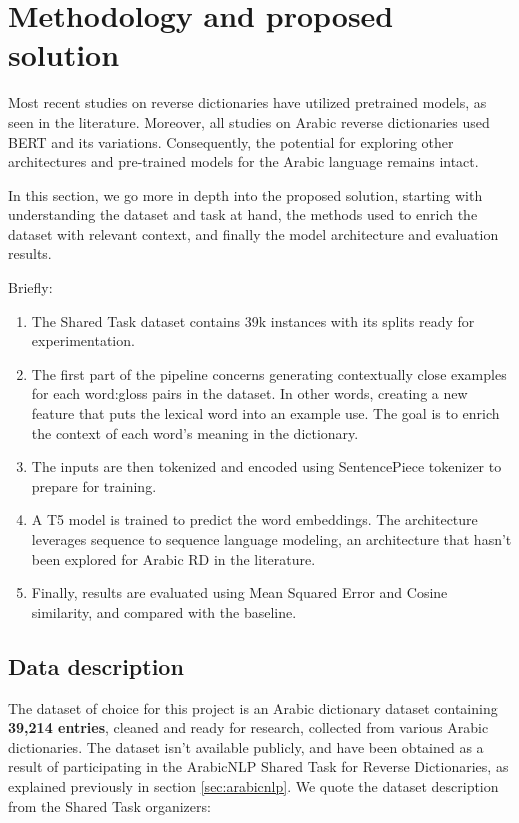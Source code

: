 \documentclass[12.5pt]{article}
\begin{document}
\newpage

\section{Methodology and proposed solution}

Most recent studies on reverse dictionaries have utilized pretrained models, as seen in the literature. Moreover, all studies on Arabic reverse dictionaries used BERT and its variations. Consequently, the potential for exploring other architectures and pre-trained models for the Arabic language remains intact. 

In this section, we go more in depth into the proposed solution, starting with understanding the dataset and task at hand, the methods used to enrich the dataset with relevant context, and finally the model architecture and evaluation results.

Briefly:
\begin{enumerate}
    \item The Shared Task dataset contains 39k instances with its splits ready for experimentation.
    \item The first part of the pipeline concerns generating contextually close examples for each word:gloss pairs in the dataset. In other words, creating a new feature that puts the lexical word into an example use. The goal is to enrich the context of each word's meaning in the dictionary.
    \item The inputs are then tokenized and encoded using SentencePiece tokenizer to prepare for training.
    \item A T5 model is trained to predict the word embeddings. The architecture leverages sequence to sequence language modeling, an architecture that hasn’t been explored for Arabic RD in the literature.
    \item Finally, results are evaluated using Mean Squared Error and Cosine similarity, and compared with the baseline.
\end{enumerate}

\subsection{Data description}

The dataset of choice for this project is an Arabic dictionary dataset containing \textbf{39,214 entries}, cleaned and ready for research, collected from various Arabic dictionaries. The dataset isn't available publicly, and have been obtained as a result of participating in the ArabicNLP Shared Task for Reverse Dictionaries, as explained previously in section \ref{sec:arabicnlp}. We quote the dataset description from the Shared Task organizers:
\end{document}
